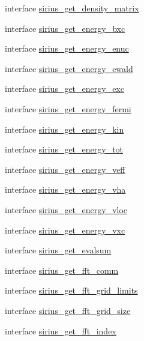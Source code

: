 \begin{DoxyCompactItemize}
\item 
interface \hyperlink{interfacesirius_1_1sirius__get__density__matrix}{sirius\+\_\+get\+\_\+density\+\_\+matrix}
\item 
interface \hyperlink{interfacesirius_1_1sirius__get__energy__bxc}{sirius\+\_\+get\+\_\+energy\+\_\+bxc}
\item 
interface \hyperlink{interfacesirius_1_1sirius__get__energy__enuc}{sirius\+\_\+get\+\_\+energy\+\_\+enuc}
\item 
interface \hyperlink{interfacesirius_1_1sirius__get__energy__ewald}{sirius\+\_\+get\+\_\+energy\+\_\+ewald}
\item 
interface \hyperlink{interfacesirius_1_1sirius__get__energy__exc}{sirius\+\_\+get\+\_\+energy\+\_\+exc}
\item 
interface \hyperlink{interfacesirius_1_1sirius__get__energy__fermi}{sirius\+\_\+get\+\_\+energy\+\_\+fermi}
\item 
interface \hyperlink{interfacesirius_1_1sirius__get__energy__kin}{sirius\+\_\+get\+\_\+energy\+\_\+kin}
\item 
interface \hyperlink{interfacesirius_1_1sirius__get__energy__tot}{sirius\+\_\+get\+\_\+energy\+\_\+tot}
\item 
interface \hyperlink{interfacesirius_1_1sirius__get__energy__veff}{sirius\+\_\+get\+\_\+energy\+\_\+veff}
\item 
interface \hyperlink{interfacesirius_1_1sirius__get__energy__vha}{sirius\+\_\+get\+\_\+energy\+\_\+vha}
\item 
interface \hyperlink{interfacesirius_1_1sirius__get__energy__vloc}{sirius\+\_\+get\+\_\+energy\+\_\+vloc}
\item 
interface \hyperlink{interfacesirius_1_1sirius__get__energy__vxc}{sirius\+\_\+get\+\_\+energy\+\_\+vxc}
\item 
interface \hyperlink{interfacesirius_1_1sirius__get__evalsum}{sirius\+\_\+get\+\_\+evalsum}
\item 
interface \hyperlink{interfacesirius_1_1sirius__get__fft__comm}{sirius\+\_\+get\+\_\+fft\+\_\+comm}
\item 
interface \hyperlink{interfacesirius_1_1sirius__get__fft__grid__limits}{sirius\+\_\+get\+\_\+fft\+\_\+grid\+\_\+limits}
\item 
interface \hyperlink{interfacesirius_1_1sirius__get__fft__grid__size}{sirius\+\_\+get\+\_\+fft\+\_\+grid\+\_\+size}
\item 
interface \hyperlink{interfacesirius_1_1sirius__get__fft__index}{sirius\+\_\+get\+\_\+fft\+\_\+index}
\item 

\end{DoxyCompactItemize}
